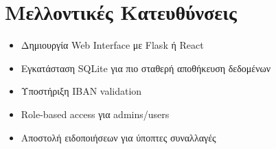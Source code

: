 \documentclass[a4paper,12pt]{article}
\begin{document}
\section{Μελλοντικές Κατευθύνσεις}
\begin{itemize}[label=\textbullet]
    \item Δημιουργία Web Interface με Flask ή React
    \item Εγκατάσταση SQLite για πιο σταθερή αποθήκευση δεδομένων
    \item Υποστήριξη IBAN validation
    \item Role-based access για admins/users
    \item Αποστολή ειδοποιήσεων για ύποπτες συναλλαγές
\end{itemize}
\end{document}
